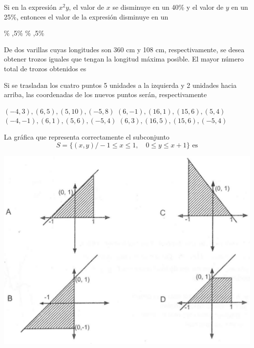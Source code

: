 \documentclass[10pt,letterpaper,addpoints]{exam}
\begin{document}
\begin{multicols}{2}
\begin{questions}
\question
Si en la expresión $ x^2y $, el valor de $ x $ se disminuye en un 40\% y el valor de $ y $ en un 25\%, entonces el valor de la expresión disminuye en un

\begin{oneparchoices}
\% ,5\% \% ,5\%
\end{oneparchoices}
\question
De dos varillas cuyas longitudes son 360 cm y 108 cm, respectivamente, se desea obtener trozos iguales que tengan la longitud máxima posible. El mayor número total de trozos obtenidos es

\begin{oneparchoices}
        
\end{oneparchoices}
\question Si se trasladan los cuatro puntos 5 unidades a la izquierda y 2 unidades hacia arriba, las coordenadas de los nuevos puntos serán, respectivamente
\begin{center}
\end{center}
\begin{choices}
  \CorrectChoice $(-4,3), (6,5), (5,10), (-5,8)$
  \choice $(6,-1), (16,1), (15,6), (5,4)$
  \choice $(-4,-1), (6,1), (5,6), (-5,4)$
  \choice $(6,3), (16,5), (15,6), (-5,4)$
\end{choices}
  \question La gráfica que representa correctamente el subconjunto \[ S=\{(x,y)/ -1\leq x\leq 1, \quad 0\leq y \leq x+1\} \text{ es} \]
     \begin{center}
   \includegraphics[scale=0.45]{Images/grafica-plano.png} 

\end{center}
\end{questions}
\end{multicols}
\end{document}

